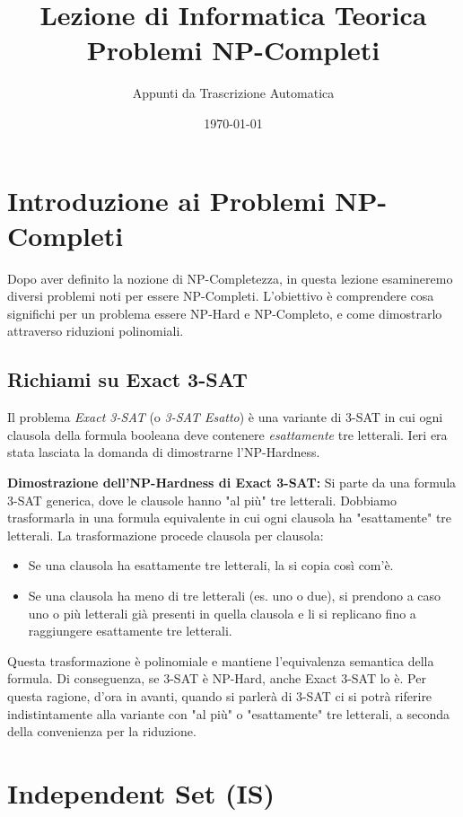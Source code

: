 \documentclass[a4paper]{article}
\title{Lezione di Informatica Teorica \\ \Large Problemi NP-Completi}
\author{Appunti da Trascrizione Automatica}
\date{\today}
\theoremstyle{definition} %
\theoremstyle{definition} %
\begin{document}
\maketitle
\tableofcontents
\newpage

\section{Introduzione ai Problemi NP-Completi}

Dopo aver definito la nozione di NP-Completezza, in questa lezione esamineremo diversi problemi noti per essere NP-Completi. L'obiettivo è comprendere cosa significhi per un problema essere NP-Hard e NP-Completo, e come dimostrarlo attraverso riduzioni polinomiali.

\subsection{Richiami su Exact 3-SAT}

Il problema \emph{Exact 3-SAT} (o \emph{3-SAT Esatto}) è una variante di 3-SAT in cui ogni clausola della formula booleana deve contenere \emph{esattamente} tre letterali. Ieri era stata lasciata la domanda di dimostrarne l'NP-Hardness.

\textbf{Dimostrazione dell'NP-Hardness di Exact 3-SAT:}
Si parte da una formula 3-SAT generica, dove le clausole hanno "al più" tre letterali. Dobbiamo trasformarla in una formula equivalente in cui ogni clausola ha "esattamente" tre letterali.
La trasformazione procede clausola per clausola:
\begin{itemize}
    \item Se una clausola ha esattamente tre letterali, la si copia così com'è.
    \item Se una clausola ha meno di tre letterali (es. uno o due), si prendono a caso uno o più letterali già presenti in quella clausola e li si replicano fino a raggiungere esattamente tre letterali.
\end{itemize}
Questa trasformazione è polinomiale e mantiene l'equivalenza semantica della formula. Di conseguenza, se 3-SAT è NP-Hard, anche Exact 3-SAT lo è. Per questa ragione, d'ora in avanti, quando si parlerà di 3-SAT ci si potrà riferire indistintamente alla variante con "al più" o "esattamente" tre letterali, a seconda della convenienza per la riduzione.

\section{Independent Set (IS)}
\end{document}
